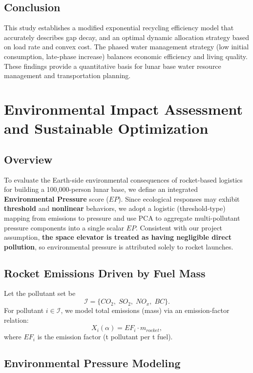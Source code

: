 \documentclass{mcmthesis}
\begin{document}
\subsection{Conclusion}
This study establishes a modified exponential recycling efficiency model that accurately describes gap decay, and an optimal dynamic allocation strategy based on load rate and convex cost. The phased water management strategy (low initial consumption, late-phase increase) balances economic efficiency and living quality. These findings provide a quantitative basis for lunar base water resource management and transportation planning.



\section{Environmental Impact Assessment and Sustainable Optimization}
\label{sec:env}

\subsection{Overview}
\label{subsec:env_en_overview}
To evaluate the Earth-side environmental consequences of rocket-based logistics for building a 100,000-person lunar base, we define an integrated \textbf{Environmental Pressure} score ($EP$). Since ecological responses may exhibit \textbf{threshold} and \textbf{nonlinear} behaviors, we adopt a logistic (threshold-type) mapping from emissions to pressure and use PCA to aggregate multi-pollutant pressure components into a single scalar $EP$. Consistent with our project assumption, \textbf{the space elevator is treated as having negligible direct pollution}, so environmental pressure is attributed solely to rocket launches.

\subsection{Rocket Emissions Driven by Fuel Mass}
\label{subsec:env_en_emission}
Let the pollutant set be
\[
\mathcal{I}=\{CO_2,\;  SO_2,\; NO_x,\; BC\}.
\]
For pollutant $i\in\mathcal{I}$, we model total emissions (mass) via an emission-factor relation:
\begin{equation}
X_i(\alpha)=EF_i\cdot m_{rocket},
\label{eq:env_emission_factor_en}
\end{equation}
where $EF_i$ is the emission factor (t pollutant per t fuel).

\subsection{Environmental Pressure Modeling}
\label{subsec:env_pca_then_logistic}
\end{document}
